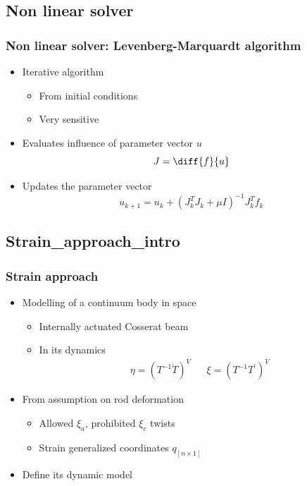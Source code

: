 \documentclass[compress]{thesisbeamer}
\begin{document}
		\subsection{Non linear solver}
        \begin{frame}
        	\frametitle{Non linear solver: Levenberg-Marquardt algorithm}
			\begin{itemize}%
  				\item Iterative algorithm
  				\begin{itemize}
  					\item From initial conditions
  					\item Very sensitive
  				\end{itemize}
  				\item Evaluates influence of parameter vector $ u $
  				\begin{equation}
  				J = \diff{f}{u}
  				\end{equation}
  				\item Updates the parameter vector
  				\begin{equation}
  				{u}_{k+1} = {u}_{k} + {\left({J}_{k}^{T} {J}_{k} + \mu I \right)}^{-1} {J}_{k}^{T} {f}_{k}
  				\end{equation}
 			\end{itemize}
		\end{frame}
		
		\subsection{Strain_approach_intro}
        \begin{frame}
        	\frametitle{Strain approach}
			\begin{itemize}%
  				\item Modelling of a continuum body in space
  				\begin{itemize}
  					\item Internally actuated Cosserat beam
  					\item In its dynamics
  					\begin{align}
  						\eta = \left( T^{-1}\dot{T} \right)^V && \xi = \left( T^{-1} {T}^{'} \right)^V
  					\end{align}
				\end{itemize}
  				\item From assumption on rod deformation
  				\begin{itemize}
  					\item Allowed $ \xi_a $, prohibited $ \xi_c $ twists
  					\item Strain generalized coordinates $ q_{[n\times1]}$
  				\end{itemize}
  				\item Define its dynamic model
 			\end{itemize}
		\end{frame}
		
\end{document}
